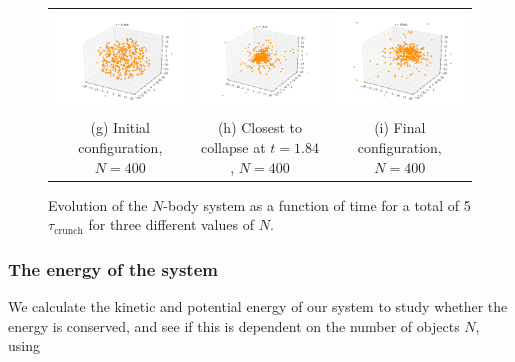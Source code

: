 \documentclass{article}
\begin{document}
\begin{multicols}{2}
\begin{figure}
\begin{center}
\begin{tabular}{ccc}
	\includegraphics[width=60mm]{Images/Image_400_0000.png}
	& \includegraphics[width=60mm]{Images/Image_400_1835.png}
	& \includegraphics[width=60mm]{Images/Image_400_4995.png} \\
	(g) Initial configuration, $N = 400$					& (h) Closest to collapse at $t = 1.84$, $N = 400$	 	& (i) Final configuration, $N = 400$	 \\[6pt]
\end{tabular}
\caption{Evolution of the $N$-body system as a function of time for a total of 5$\tau_{\mathrm{crunch}}$ for three different values of $N$.}\label{fig:N_body_simulation}
\end{center}
\end{figure}


\subsubsection{The energy of the system}

We calculate the kinetic and potential energy of our system to study whether the energy is conserved, and see if this is dependent on the number of objects $N$, using


\end{multicols}
\end{document}
